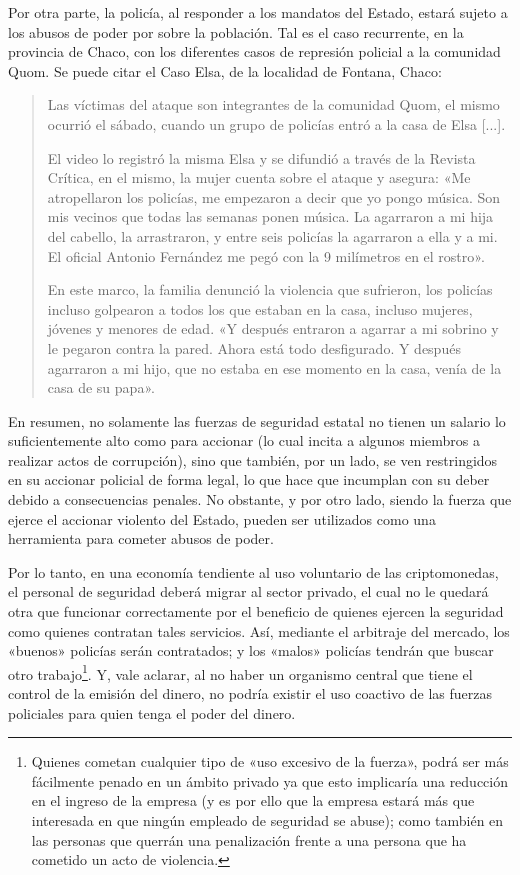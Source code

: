 \documentclass[12pt,a4paper,twoside]{book}
\begin{document}
Por otra parte, la policía, al responder a los mandatos del Estado, estará sujeto a los abusos de poder por sobre la población. Tal es el caso recurrente, en la provincia de Chaco, con los diferentes casos de represión policial a la comunidad Quom. Se puede citar el Caso Elsa, de la localidad de Fontana, Chaco:

\begin{quotation}
Las víctimas del ataque son integrantes de la comunidad Quom, el mismo ocurrió el sábado, cuando un grupo de policías entró a la casa de Elsa [...].

El video lo registró la misma Elsa y se difundió a través de la Revista Crítica, en el mismo, la mujer cuenta sobre el ataque y asegura: «Me atropellaron los policías, me empezaron a decir que yo pongo música. Son mis vecinos que todas las semanas ponen música. La agarraron a mi hija del cabello, la arrastraron, y entre seis policías la agarraron a ella y a mi. El oficial Antonio Fernández me pegó con la 9 milímetros en el rostro».

En este marco, la familia denunció la violencia que sufrieron, los policías incluso golpearon a todos los que estaban en la casa, incluso mujeres, jóvenes y menores de edad. «Y después entraron a agarrar a mi sobrino y le pegaron contra la pared. Ahora está todo desfigurado. Y después agarraron a mi hijo, que no estaba en ese momento en la casa, venía de la casa de su papa». \cite{caso:quom}
\end{quotation}

En resumen, no solamente las fuerzas de seguridad estatal no tienen un salario lo suficientemente alto como para accionar (lo cual incita a algunos miembros a realizar actos de corrupción), sino que también, por un lado, se ven restringidos en su accionar policial de forma legal, lo que hace que incumplan con su deber debido a consecuencias penales. No obstante, y por otro lado, siendo la fuerza que ejerce el accionar violento del Estado, pueden ser utilizados como una herramienta para cometer abusos de poder.

Por lo tanto, en una economía tendiente al uso voluntario de las criptomonedas, el personal de seguridad deberá migrar al sector privado, el cual no le quedará otra que funcionar correctamente por el beneficio de quienes ejercen la seguridad como quienes contratan tales servicios. Así, mediante el arbitraje del mercado, los «buenos» policías serán contratados; y los «malos» policías tendrán que buscar otro trabajo\footnote{Quienes cometan cualquier tipo de «uso excesivo de la fuerza», podrá ser más fácilmente penado en un ámbito privado ya que esto implicaría una reducción en el ingreso de la empresa (y es por ello que la empresa estará más que interesada en que ningún empleado de seguridad se abuse); como también en las personas que querrán una penalización frente a una persona que ha cometido un acto de violencia.}. Y, vale aclarar, al no haber un organismo central que tiene el control de la emisión del dinero, no podría existir el uso coactivo de las fuerzas policiales para quien tenga el poder del dinero.
\end{document}
